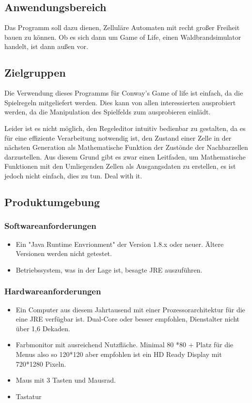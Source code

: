 \documentclass[11pt,a4paper]{article}
\begin{document}
\subsection{Anwendungsbereich}
Das Programm soll dazu dienen, Zelluläre Automaten mit recht großer Freiheit bauen zu können. Ob es sich dann um Game of Life, einen Waldbrandsimulator handelt, ist dann außen vor.
\subsection{Zielgruppen}
Die Verwendung dieses Programms für Conway's Game of life ist einfach, da die Spielregeln mitgeliefert werden. Dies kann von allen interessierten ausprobiert werden, da die Manipulation des Spielfelds zum ausprobieren einlädt.

Leider ist es nicht möglich, den Regeleditor intuitiv bedienbar zu gestalten, da es für eine effiziente Verarbeitung notwendig ist, den Zustand einer Zelle in der nächsten Generation als Mathematische Funktion der Zustönde der Nachbarzellen darzustellen. Aus diesem Grund gibt es zwar einen Leitfaden, um Mathematische Funktionen mit den Umliegenden Zellen als Ausgangsdaten zu erstellen, es ist jedoch nicht einfach, dies zu tun. Deal with it.

\subsection{Produktumgebung}

\subsubsection{Softwareanforderungen}
\begin{itemize}
    \item Ein "Java Runtime Envrionment" der Version 1.8.x oder neuer. Ältere Versionen werden nicht getestet.
    \item Betriebssystem, was in der Lage ist, besagte JRE auszuführen. 
\end{itemize}

\subsubsection{Hardwareanforderungen}


\begin{itemize}
    \item Ein Computer aus diesem Jahrtausend mit einer Prozessorarchitektur für die eine JRE verfügbar ist. Dual-Core oder besser empfohlen, Dienstalter nicht über 1,6 Dekaden.
    \item Farbmonitor mit ausreichend Nutzfläche. Minimal 80 *80 + Platz für die Menus also so 120*120 aber empfohlen ist ein HD Ready Display mit 720*1280 Pixeln.
    \item Maus mit 3 Tasten und Mausrad. 
    \item Tastatur
\end{itemize}
\end{document}
